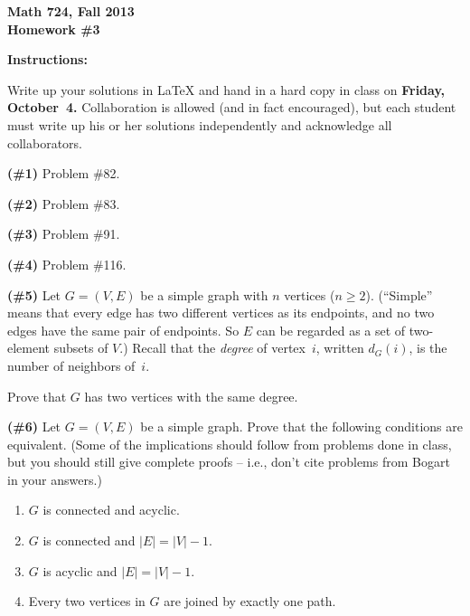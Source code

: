
\setcounter{exprobno}{0}
\newcommand{\exprob}{\vskip10bp\addtocounter{probno}{1}{\bf(E{\arabic{probno}})}\quad}
\newcommand{\booksection}[1]{\bigskip\hrule\medskip\textbf{#1}}

\thispagestyle{empty}
{\bf Math 724, Fall 2013\\
Homework \#3

\bf Instructions:} Write up your solutions in LaTeX and hand in a hard copy in class on {\bf Friday, October~4.}  Collaboration is allowed (and in fact encouraged), but each student must write up his or her solutions independently and acknowledge all collaborators.

{\bf(\#1)} Problem \#82.%

{\bf(\#2)} Problem \#83.%

{\bf(\#3)} Problem \#91.%

{\bf(\#4)} Problem \#116.%

{\bf(\#5)} Let $G=(V,E)$ be a simple graph with $n$ vertices ($n\geq 2$).  (``Simple'' means that every edge has two different vertices as its endpoints, and no two edges have the same pair of endpoints.  So $E$ can be regarded as a set of two-element subsets of $V$.)  Recall that the \emph{degree} of vertex~$i$, written $d_G(i)$,
is the number of neighbors of~$i$.

Prove that $G$ has two vertices with the same degree.

\bigskip
\bigskip

{\bf(\#6)} Let $G=(V,E)$ be a simple graph.
Prove that the following conditions are equivalent.  (Some of the implications
should follow from problems done in class, but you should still give complete proofs -- i.e., don't cite problems from Bogart in your answers.)
\begin{enumerate}
\item $G$ is connected and acyclic.
\item $G$ is connected and $|E|=|V|-1$.
\item $G$ is acyclic and $|E|=|V|-1$.
\item Every two vertices in $G$ are joined by exactly one path.
\end{enumerate}

\bigskip
\bigskip



